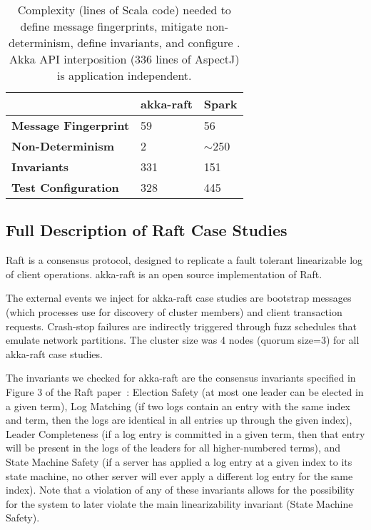 \begin{table}
\centering
\begin{tabular}{|l|l|l|}
  \cline{2-3}
  \multicolumn{1}{c|}{~} & \textbf{akka-raft} & \textbf{Spark} \\\cline{2-3} \hline
{\textbf{Message Fingerprint}} & 59 & 56 \\
\hline
{\textbf{Non-Determinism}} & 2 & {\footnotesize $\sim$}250 \\
\hline
{\textbf{Invariants}} & 331 & 151 \\
\hline
{\textbf{Test Configuration}} & 328 & 445 \\
\hline
\end{tabular}
\caption{Complexity (lines of Scala code) needed to define message
fingerprints, mitigate non-determinism, define invariants, and configure \sys.
Akka API interposition (336 lines of AspectJ) is application independent.}
\label{tab:instrumentation}
\end{table}

\subsection{Full Description of Raft Case Studies}
\label{app:raft_case_studies}

Raft is a consensus protocol, designed to replicate a fault tolerant linearizable log of
client operations. akka-raft is an open source implementation of Raft.

The external events we inject for akka-raft case studies are
bootstrap messages (which
processes use for discovery of cluster members)
and client transaction requests. Crash-stop failures are indirectly triggered through
fuzz schedules that emulate network partitions.
The cluster size was 4 nodes
(quorum size=3) for all akka-raft case studies.

The invariants we checked for akka-raft are the consensus invariants specified in
Figure 3 of the Raft paper~\cite{ongaro2014search}: Election Safety
(at most one leader can be elected in a
given term), Log Matching (if two logs contain an entry with the same
index and term, then the logs are identical in all entries
up through the given index), Leader Completeness (if a log entry is
committed in a
given term, then that entry will be present in the logs
of the leaders for all higher-numbered terms), and State Machine Safety
(if a server has applied a log entry
at a given index to its state machine, no other server
will ever apply a different log entry for the same index). Note that a
violation of any of these invariants allows for the possibility for the system
to later violate
the main linearizability invariant (State Machine Safety).


